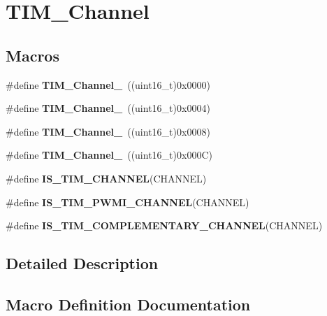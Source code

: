 \hypertarget{group___t_i_m___channel}{}\section{T\+I\+M\+\_\+\+Channel}
\label{group___t_i_m___channel}
\subsection*{Macros}
\begin{DoxyCompactItemize}
\item 
\hypertarget{group___t_i_m___channel_ga69ea7f558f02c63dd1082d784d2449bd}{}\#define {\bfseries T\+I\+M\+\_\+\+Channel\+\_}~((uint16\+\_\+t)0x0000)\label{group___t_i_m___channel_ga69ea7f558f02c63dd1082d784d2449bd}

\item 
\hypertarget{group___t_i_m___channel_ga03d7da8269a87a560f68985b4bd80931}{}\#define {\bfseries T\+I\+M\+\_\+\+Channel\+\_}~((uint16\+\_\+t)0x0004)\label{group___t_i_m___channel_ga03d7da8269a87a560f68985b4bd80931}

\item 
\hypertarget{group___t_i_m___channel_ga012711b19e8c91f6f352801a3dc0bcc9}{}\#define {\bfseries T\+I\+M\+\_\+\+Channel\+\_}~((uint16\+\_\+t)0x0008)\label{group___t_i_m___channel_ga012711b19e8c91f6f352801a3dc0bcc9}

\item 
\hypertarget{group___t_i_m___channel_ga7414888c40d066af235bc1f80b99bd9d}{}\#define {\bfseries T\+I\+M\+\_\+\+Channel\+\_}~((uint16\+\_\+t)0x000\+C)\label{group___t_i_m___channel_ga7414888c40d066af235bc1f80b99bd9d}

\item 
\#define {\bfseries I\+S\+\_\+\+T\+I\+M\+\_\+\+C\+H\+A\+N\+N\+E\+L}(C\+H\+A\+N\+N\+E\+L)
\item 
\#define {\bfseries I\+S\+\_\+\+T\+I\+M\+\_\+\+P\+W\+M\+I\+\_\+\+C\+H\+A\+N\+N\+E\+L}(C\+H\+A\+N\+N\+E\+L)
\item 
\#define {\bfseries I\+S\+\_\+\+T\+I\+M\+\_\+\+C\+O\+M\+P\+L\+E\+M\+E\+N\+T\+A\+R\+Y\+\_\+\+C\+H\+A\+N\+N\+E\+L}(C\+H\+A\+N\+N\+E\+L)
\end{DoxyCompactItemize}


\subsection{Detailed Description}


\subsection{Macro Definition Documentation}
\hypertarget{group___t_i_m___channel_gae9721e3731e5fd983c83a9c1d32ef03d}{}
